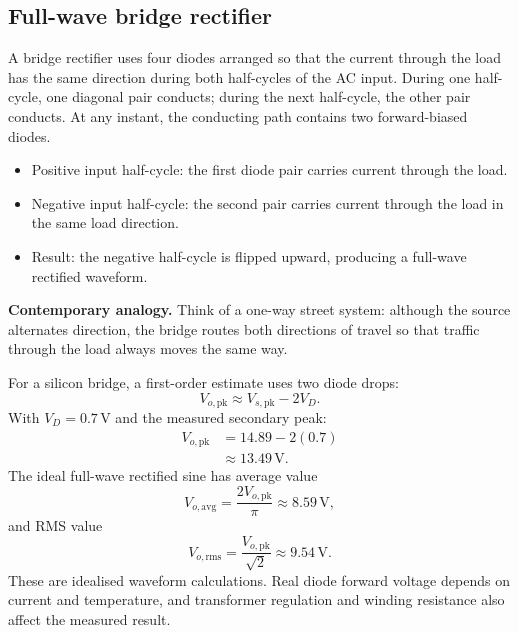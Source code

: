 \documentclass[journal,12pt,twocolumn]{IEEEtran}
\begin{document}
\subsection*{Full-wave bridge rectifier}
A bridge rectifier uses four diodes arranged so that the current
through the load has the same direction during both half-cycles of
the AC input. During one half-cycle, one diagonal pair conducts;
during the next half-cycle, the other pair conducts. At any instant,
the conducting path contains two forward-biased diodes.

\begin{itemize}[leftmargin=1.5em]
    \item Positive input half-cycle: the first diode pair carries
    current through the load.
    \item Negative input half-cycle: the second pair carries current
    through the load in the same load direction.
    \item Result: the negative half-cycle is flipped upward, producing
    a full-wave rectified waveform.
\end{itemize}

\textbf{Contemporary analogy.} Think of a one-way street system:
although the source alternates direction, the bridge routes both
directions of travel so that traffic through the load always moves
the same way.

For a silicon bridge, a first-order estimate uses two diode drops:
\begin{equation}
    \boxed{V_{o,\mathrm{pk}}\approx V_{s,\mathrm{pk}}-2V_D.}
    \label{eq:bridge-peak}
\end{equation}
With $V_D=0.7\,\mathrm{V}$ and the measured secondary peak:
\begin{align}
    V_{o,\mathrm{pk}}
    &=14.89-2(0.7)\\
    &\approx 13.49\,\mathrm{V}.
\end{align}
The ideal full-wave rectified sine has average value
\begin{equation}
    \boxed{V_{o,\mathrm{avg}}=\frac{2V_{o,\mathrm{pk}}}{\pi}}
    \approx 8.59\,\mathrm{V},
    \label{eq:rect-average}
\end{equation}
and RMS value
\begin{equation}
    \boxed{V_{o,\mathrm{rms}}=\frac{V_{o,\mathrm{pk}}}{\sqrt{2}}}
    \approx 9.54\,\mathrm{V}.
    \label{eq:rect-rms}
\end{equation}
These are idealised waveform calculations. Real diode forward
voltage depends on current and temperature, and transformer
regulation and winding resistance also affect the measured result.
\end{document}
